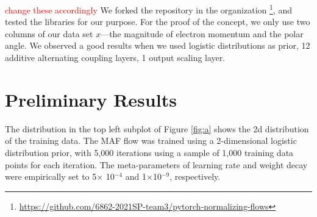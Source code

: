 \textcolor{red}{change these accordingly} We forked the repository in the organization \footnote{\url{https://github.com/6862-2021SP-team3/pytorch-normalizing-flows}}, and tested the libraries for our purpose. For the proof of the concept, we only use two columns of our data set $x$---the magnitude of electron momentum and the polar angle. We observed a good results when we used logistic distributions as prior, 12 additive alternating coupling layers, 1 output scaling layer.

\section{Preliminary Results}
The distribution in the top left subplot of Figure \ref{fig:a} shows the 2d distribution of the training data. The MAF flow was trained using a 2-dimensional logistic distribution prior, with 5,000 iterations using a sample of 1,000 training data points for each iteration. The meta-parameters of learning rate and weight decay were empirically set to 5$\times$ 10$^{-4}$ and 1$\times$10$^{-9}$, respectively. 

